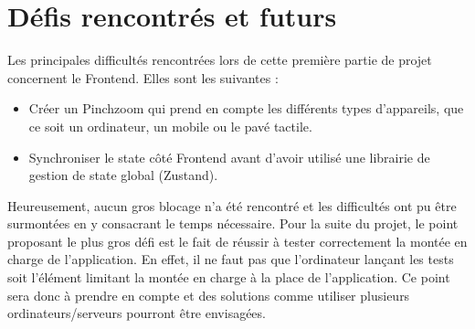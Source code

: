 \section{Défis rencontrés et futurs}

Les principales difficultés rencontrées lors de cette première partie de projet concernent le Frontend. Elles sont les suivantes :

\begin{itemize}
  \item Créer un Pinchzoom qui prend en compte les différents types d'appareils, que ce soit un ordinateur, un mobile ou le pavé tactile.
  \item Synchroniser le state côté Frontend avant d'avoir utilisé une librairie de gestion de state global (Zustand).
\end{itemize}

Heureusement, aucun gros blocage n'a été rencontré et les difficultés ont pu être surmontées en y consacrant le temps nécessaire. Pour la suite du projet, le point proposant le plus gros défi est le fait de réussir à tester correctement la montée en charge de l'application. En effet, il ne faut pas que l'ordinateur lançant les tests soit l'élément limitant la montée en charge à la place de l'application. Ce point sera donc à prendre en compte et des solutions comme utiliser plusieurs ordinateurs/serveurs pourront être envisagées.

\vfil
\hspace{8cm}\makeatletter\@author\makeatother\par
\hspace{8cm}\begin{minipage}{5cm}
\end{minipage}
